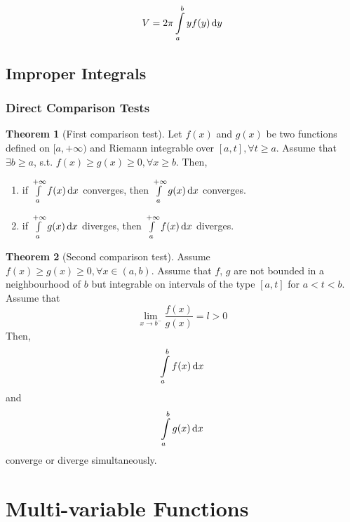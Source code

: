 \documentclass[fleqn, a4paper, 10pt]{article}
\theoremstyle{definition}
\theoremstyle{theorem}
\newtheorem{theorem}{Theorem}
\theoremstyle{remark}
\begin{document}
\begin{multicols}{2}

\begin{equation*}
	V = 2 \pi \int\limits_{a}^{b} y f(y) \dif y
\end{equation*}

\subsection{Improper Integrals}

\subsubsection{Direct Comparison Tests}

\begin{theorem}[First comparison test]
	Let $f(x)$ and $g(x)$ be two functions defined on $[a, +\infty)$ and Riemann integrable over $[a, t], \forall t \geq a$. Assume that $\exists b \geq a$, s.t. $f(x) \geq g(x) \geq 0, \forall x \geq b$. Then,
	\begin{enumerate}
		\item if $\int\limits_{a}^{+\infty} f(x) \dif x$ converges, then $\int\limits_{a}^{+\infty} g(x) \dif x$ converges.
		\item if $\int\limits_{a}^{+\infty} g(x) \dif x$ diverges, then $\int\limits_{a}^{+\infty} f(x) \dif x$ diverges.
	\end{enumerate}
\end{theorem}

\begin{theorem}[Second comparison test]
	Assume $f(x) \geq g(x) \geq 0, \forall x \in (a,b)$. Assume that $f$, $g$ are not bounded in a neighbourhood of $b$ but integrable on intervals of the type $[a, t]$ for $a < t < b$. Assume that 
	\begin{equation*}
		\lim\limits_{x \to b^-} \dfrac{f(x)}{g(x)} = l > 0
	\end{equation*}
	Then, \[\int\limits_{a}^{b} f(x) \dif x\]and \[\int\limits_{a}^{b} g(x) \dif x\] converge or diverge simultaneously.
\end{theorem}

\section{Multi-variable Functions}


\end{multicols}
\end{document}
